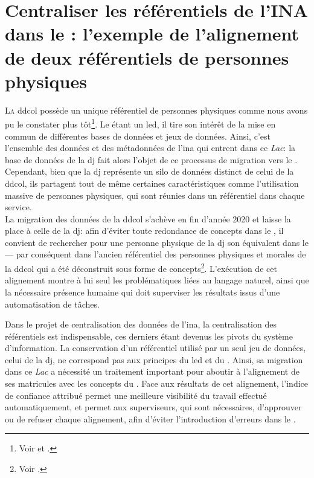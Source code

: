 \chapter{\label{III-C}Centraliser les référentiels de l’INA dans le \ldd: l'exemple de l'alignement de deux référentiels de personnes physiques}

\lettrine{L}a \ac{ddcol} possède un unique référentiel de personnes physiques comme nous avons pu le constater plus tôt\footnote{Voir  et .}. Le \ldd étant un \ac{led}, il tire son intérêt de la mise en commun de différentes bases de données et jeux de données. Ainsi, c'est l'ensemble des données et des métadonnées de l'\ac{ina} qui entrent dans ce \textit{Lac}: la base de données de la \ac{dj} fait alors l'objet de ce processus de migration vers le \ldd. Cependant, bien que la \ac{dj} représente un silo de données distinct de celui de la \ac{ddcol}, ils partagent tout de même certaines caractéristiques comme l'utilisation massive de personnes physiques, qui sont réunies dans un référentiel dans chaque service.\\

La migration des données de la \ac{ddcol} s'achève en fin d'année 2020 et laisse la place à celle de la \ac{dj}: afin d'éviter toute redondance de concepts dans le \ldd, il convient de rechercher pour une personne physique de la \ac{dj} son équivalent dans le \ldd --- par conséquent dans l'ancien référentiel des personnes physiques et morales de la \ac{ddcol} qui a été déconstruit sous forme de concepts\footnote{Voir .}. L'exécution de cet alignement montre à lui seul les problématiques liées au langage naturel, ainsi que la nécessaire présence humaine qui doit superviser les résultats issus d'une automatisation de tâches.





\bigskip
\bigskip
Dans le projet de centralisation des données de l'\ac{ina}, la centralisation des référentiels est indispensable, ces derniers étant devenus les pivots du système d'information. La conservation d'un référentiel utilisé par un seul jeu de données, celui de la \ac{dj}, ne correspond pas aux principes du \ac{led} et du \ldd. Ainsi, sa migration dans ce \textit{Lac} a nécessité un traitement important pour aboutir à l'alignement de ses matricules avec les concepts du \ldd. Face aux résultats de cet alignement, l'indice de confiance attribué permet une meilleure visibilité du travail effectué automatiquement, et permet aux superviseurs, qui sont nécessaires, d'approuver ou de refuser chaque alignement, afin d'éviter l'introduction d'erreurs dans le \ldd.